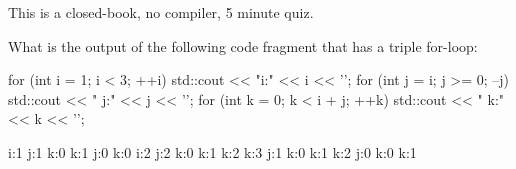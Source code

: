 

This is a closed-book, no compiler, 5 minute quiz.

\nextq
What is the output of the following code fragment that has a triple
for-loop:
\begin{console}
for (int i = 1; i < 3; ++i)
{
    std::cout << "i:" << i << '\n';
    for (int j = i; j >= 0; --j)
    {
        std::cout << " j:" << j << '\n';
        for (int k = 0; k < i + j; ++k)
        {
            std::cout << "  k:" << k << '\n';
        }
    }
}
\end{console}
\ANSWER
\begin{answercode}
i:1
 j:1
  k:0
  k:1
 j:0
  k:0
i:2
 j:2
  k:0
  k:1
  k:2
  k:3
 j:1
  k:0
  k:1
  k:2
 j:0
  k:0
  k:1
\end{answercode}


